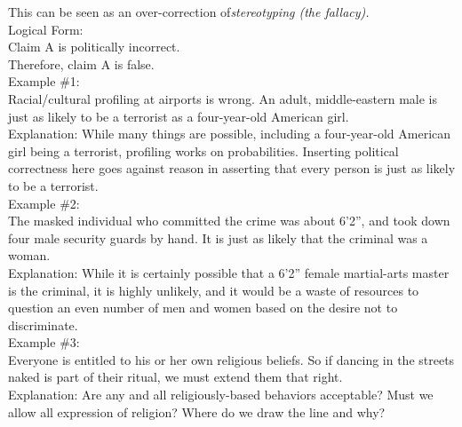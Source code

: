 \documentclass[a4paper,12pt,single,pdftex]{scrbook}
\begin{document}
    
      This can be seen as an over-correction of{\it  stereotyping (the fallacy). \newline
}
    \\

    
      Logical Form:
    \\

    
      Claim A is politically incorrect.
    \\

    
      Therefore, claim A is false.
    \\

    
      Example \#1:
    \\

    
      Racial/cultural profiling at airports is wrong.  An adult, middle-eastern male is just as likely to be a terrorist as a four-year-old American girl.
    \\

    
      Explanation: While many things are possible, including a four-year-old American girl being a terrorist, profiling works on probabilities. Inserting political correctness here goes against reason in asserting that every person is just as likely to be a terrorist.
    \\

    
      Example \#2:
    \\

    
      The masked individual who committed the crime was about 6’2”, and took down four male security guards by hand.  It is just as likely that the criminal was a woman.
    \\

    
      Explanation: While it is certainly possible that a 6’2” female martial-arts master is the criminal, it is highly unlikely, and it would be a waste of resources to question an even number of men and women based on the desire not to discriminate.
    \\

    
      Example \#3:
    \\

    
      Everyone is entitled to his or her own religious beliefs.  So if dancing in the streets naked is part of their ritual, we must extend them that right.
    \\

    
      Explanation: Are any and all religiously-based behaviors acceptable?  Must we allow all expression of religion?  Where do we draw the line and why?
    \\
\end{document}
